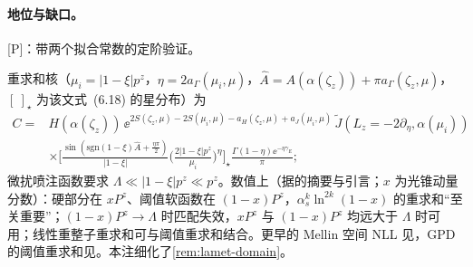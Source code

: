 \paragraph{地位与缺口。}[P]：带两个拟合常数的定阶验证\cite[第~5~节、式~(5.7)、(5.10)--(5.11)]{Ji:2023pba}。

\begin{remark}\label{rem:yzliu-threshold-domain}
重求和核\cite[式~(6.19)]{Ji:2023pba}（$\mu_i=|1-\xi|p^z$，$\eta=2a_\Gamma(\mu_i,\mu)$，$\hat A=A(\alpha(\zeta_z))+\pi a_\Gamma(\zeta_z,\mu)$，$[\ ]_\star$ 为该文式~(6.18) 的星分布）为 %
\begin{equation*}
\begin{aligned}
C={}&H(\alpha(\zeta_z))\,\ee^{2S(\zeta_z,\mu)-2S(\mu_i,\mu)-a_H(\zeta_z,\mu)+a_J(\mu_i,\mu)}\,\tilde J(L_z=-2\partial_\eta,\alpha(\mu_i))\\
&\times\Big[\frac{\sin(\mathrm{sgn}(1-\xi)\hat A+\frac{\eta\pi}2)}{|1-\xi|}\Big(\frac{2|1-\xi|p^z}{\mu_i}\Big)^\eta\Big]_\star\frac{\Gamma(1-\eta)\ee^{-\eta\gamma_E}}\pi ;
\end{aligned}
\end{equation*}
微扰喷注函数要求 $\Lambda\ll|1-\xi|p^z\ll p^z$。数值上（据\cite{Ji:2024hit}的摘要与引言；$x$ 为光锥动量分数）：硬部分在 $xP^z$、阈值软函数在 $(1-x)P^z$，$\alpha_s^k\ln^{2k}(1-x)$ 的重求和“至关重要”；$(1-x)P^z\to\Lambda$ 时匹配失效，$xP^z$ 与 $(1-x)P^z$ 均远大于 $\Lambda$ 时可用；线性重整子重求和可与阈值重求和结合。更早的 Mellin 空间 NLL 见\cite{Gao:2021hxl}，GPD 的阈值重求和见\cite{Holligan:2025baj}。本注细化了\cref{rem:lamet-domain}。
\end{remark}
